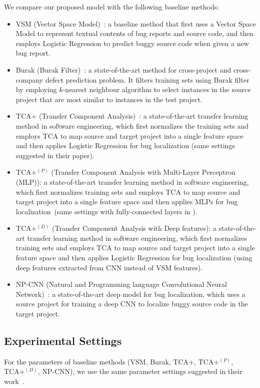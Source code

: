 We compare our proposed model \TRANPCNN with the following baseline methods:
\begin{itemize}
  \item VSM (Vector Space Model)~\cite{rao2011retrieval}: a baseline method that first uses a Vector Space Model to represent textual contents of bug reports and source code, and then employs Logistic Regression to predict buggy source code when given a new bug report.
  \item Burak (Burak Filter)~\cite{peters2013better}: a state-of-the-art method for cross-project and cross-company defect prediction problem. It filters training sets using Burak filter by employing $k$-nearest neighbour algorithm to select instances in the source project that are most similar to instances in the test project.
  \item TCA+ (Transfer Component Analysis)~\cite{NamPK13}: a state-of-the-art transfer learning method in software engineering, which first normalizes the training sets and employs TCA to map source and target project into a single feature space and then applies Logistic Regression for bug localization (same settings suggested in their paper). 
  \item TCA+$^{(P)}$ (Transfer Component Analysis with Multi-Layer Perceptron (MLP)): a state-of-the-art transfer learning method in software engineering, which first normalizes training sets and employs TCA to map source and target project into a single feature space and then applies MLPs for bug localization~(same settings with fully-connected layers in \TRANPCNN).
   \item TCA+$^{(D)}$ (Transfer Component Analysis with Deep features): a state-of-the-art transfer learning method in software engineering, which first normalizes training sets and employs TCA to map source and target project into a single feature space and then applies Logistic Regression for bug localization (using deep features extracted from CNN instead of VSM features).
  \item NP-CNN (Natural and Programming language Convolutional Neural Network)~\cite{huo2016learning}: a state-of-the-art deep model for bug localization, which uses a source project for training a deep CNN to localize buggy source code in the target project.
\end{itemize}

\subsection{Experimental Settings}
For the parameters of baseline methods (VSM, Burak, TCA+, TCA+$^{(P)}$, TCA+$^{(D)}$, NP-CNN), we use the same parameter settings suggested in their work~\cite{rao2011retrieval,NamPK13,huo2016learning}. 

